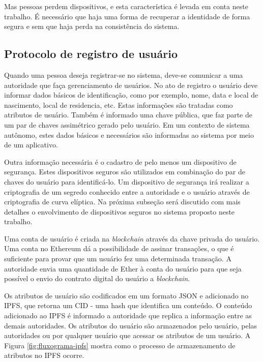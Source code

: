 \documentclass[tcc,capa]{texufpel}
\begin{document}
    Mas pessoas perdem dispositivos, e esta característica é levada em conta neste trabalho. É necessário que haja uma forma de recuperar a identidade de forma segura e sem que haja perda na consistência do sistema.
    
    \subsection{Protocolo de registro de usuário}
    
        Quando uma pessoa deseja registrar-se no sistema, deve-se comunicar a uma autoridade que faça gerenciamento de usuários. No ato de registro o usuário deve informar dados básicos de identificação, como por exemplo, nome, data e local de nascimento, local de residencia, etc. Estas informações são tratadas como atributos de usuário. Também é informado uma chave pública, que faz parte de um par de chaves assimétrico gerado pelo usuário. Em um contexto de sistema autônomo, estes dados básicos e necessários são informadas ao sistema por meio de um aplicativo.
        
        Outra informação necessária é o cadastro de pelo menos um dispositivo de segurança. Estes dispositivos seguros são utilizados em combinação do par de chaves do usuário para identificá-lo. Um dispositivo de segurança irá realizar a criptografia de um segredo conhecido entre a autoridade e o usuário através de criptografia de curva elíptica. Na próxima subseção será discutido com mais detalhes o envolvimento de dispositivos seguros no sistema proposto neste trabalho.
        
        Uma conta de usuário é criada na \textit{blockchain} através da chave privada do usuário. Uma conta no Ethereum dá a possibilidade de assinar transações, o que é suficiente para provar que um usuário fez uma determinada transação. A autoridade envia uma quantidade de Ether à conta do usuário para que seja possível o envio do contrato digital do usuário a \textit{blockchain}.
        
        Os atributos de usuário são codificados em um formato JSON e adicionado no IPFS, que retorna um CID - uma hash que identifica um conteúdo. O conteúdo adicionado ao IPFS é informado a autoridade que replica a informação entre as demais autoridades. Os atributos do usuário são armazenados pelo usuário, pelas autoridades ou por qualquer usuário que acessar os atributos de um usuário. A Figura \ref{fig:fluxograma-ipfs} mostra como o processo de armazenamento de atributos no IPFS ocorre.
        
\end{document}
